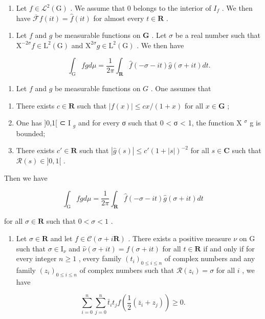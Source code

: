 \begin{enumerate}
\def\labelenumi{\alph{enumi})}
\setcounter{enumi}{2}
\tightlist
\item
  Let \(f \in \mathcal{L}^{2}(\mathrm{G})\) . We assume that 0 belongs to the interior of \(I_{f}\) . We then have \(\overline{\mathcal{F}} f(it) = \widehat{f}(it)\) for almost every \(t \in \mathbf{R}\) .
\end{enumerate}

\begin{enumerate}
\def\labelenumi{\alph{enumi})}
\setcounter{enumi}{3}
\item
  Let \(f\) and \(g\) be measurable functions on \(\mathbf{G}\) . Let \(\sigma\) be a real number such that \(\mathrm{X}^{-2\sigma}f\in \mathrm{L}^2 (\mathrm{G})\) and \(\mathrm{X}^{2\sigma}g\in \mathrm{L}^2 (\mathrm{G})\) . We then have

\[
\int_ {\mathrm{G}} f g d \mu = \frac {1}{2 \pi} \int_ {\mathbf {R}} \widehat {f} (- \sigma - i t) \widehat {g} (\sigma + i t) d t.
\]

\end{enumerate}

\begin{enumerate}
\def\labelenumi{\alph{enumi})}
\setcounter{enumi}{4}
\tightlist
\item
  Let \(f\) and \(g\) be measurable functions on \(G\) . One assumes that
\end{enumerate}

\begin{enumerate}
\def\labelenumi{(\roman{enumi})}
\item
  There exists \(c \in \mathbf{R}\) such that \(|f(x)| \leqslant cx / (1 + x)\) for all \(x \in \mathbf{G}\) ;
\item
  One has ]0,1[ ⊂ I \(_{g}\) and for every σ such that 0 < σ < 1, the function X \(^{\sigma}\) g is bounded;
\item
  There exists \(c' \in \mathbf{R}\) such that \(|\widehat{g}(s)| \leqslant c'(1 + |s|)^{-2}\) for all \(s \in \mathbf{C}\) such that \(\mathcal{R}(s) \in ]0, 1[\) .
\end{enumerate}

Then we have

\[
\int_ {\mathrm{G}} f g d \mu = \frac {1}{2 \pi} \int_ {\mathbf {R}} \widehat {f} (- \sigma - i t) \widehat {g} (\sigma + i t) d t
\]

for all \(\sigma\in\mathbf{R}\) such that \(0<\sigma<1\) .

\begin{enumerate}
\def\labelenumi{\alph{enumi})}
\setcounter{enumi}{5}
\tightlist
\item
  Let \(\sigma \in \mathbf{R}\) and let \(f \in \mathcal{C}(\sigma + i\mathbf{R})\) . There exists a positive measure \(\nu\) on G such that \(\sigma \in \mathrm{I}_{\nu}\) and \(\widehat{\nu}(\sigma + it) = f(\sigma + it)\) for all \(t \in \mathbf{R}\) if and only if for every integer \(n \geqslant 1\) , every family \((t_i)_{0 \leqslant i \leqslant n}\) of complex numbers and any family \((z_i)_{0 \leqslant i \leqslant n}\) of complex numbers such that \(\mathcal{R}(z_i) = \sigma\) for all \(i\) , we have
\end{enumerate}

\[
\sum_ {i = 0} ^ {n} \sum_ {j = 0} ^ {n} \bar {t} _ {i} t _ {j} f \left(\frac {1}{2} (\overline {{z}} _ {i} + z _ {j})\right) \geqslant 0.
\]

